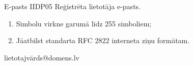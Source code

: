 \parameterTable
{E-pasts}
{IIDP05}
{
	Reģistrēta lietotāja e-pasts.
}
{
	\begin{enumerate}
		\item Simbolu virkne garumā līdz 255 simboliem;
		\item Jāatbilst standarta RFC 2822 interneta ziņu formātam.
	\end{enumerate}
}
{
	lietotajvārds@domens.lv
}

